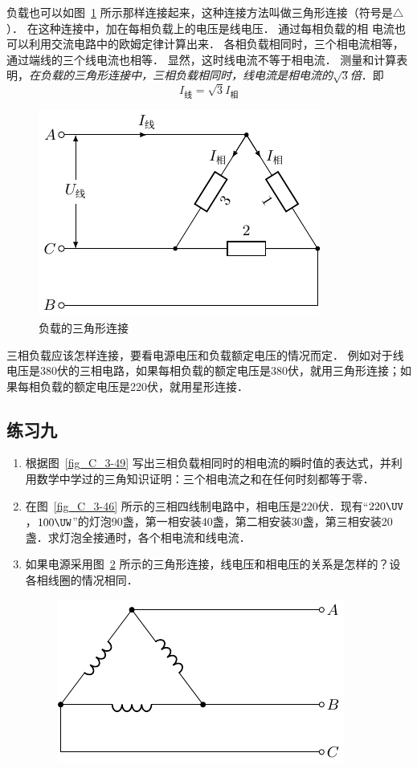 负载也可以如图~\ref{fig_C_3-52} 所示那样连接起来，这种连接方法叫做三角形连接（符号是$\triangle$）．
在这种连接中，加在每相负载上的电压是线电压．
通过每相负载的相
电流也可以利用交流电路中的欧姆定律计算出来．
各相负载相同时，三个相电流相等，通过端线的三个线电流也相等．
显然，这时线电流不等于相电流．
测量和计算表明，\textit{在负载的三角形连接中，三相负载相同时，线电流是相电流的$\sqrt{3}$倍}．即
\[I_{\text{线}}=\sqrt{3}I_{\text{相}}\]
\begin{figure}[htbp]
    \centering
    \includegraphics{fig/C/3-52.pdf}
    \caption{负载的三角形连接}\label{fig_C_3-52}
\end{figure}

三相负载应该怎样连接，要看电源电压和负载额定电压的情况而定．
例如对于线电压是380伏的三相电路，如果每相负载的额定电压是380伏，就用三角形连接；如果每相负载的额定电压是220伏，就用星形连接．

\subsection*{练习九}
\begin{enumerate}
    \item 根据图~\ref{fig_C_3-49} 写出三相负载相同时的相电流的瞬时值的表达式，并利用数学中学过的三角知识证明：三个相电流之和在任何时刻都等于零．
    \item 在图~\ref{fig_C_3-46} 所示的三相四线制电路中，相电压是220伏．现有“$220\UV $，$ 100\UW$”的灯泡90盏，第一相安装40盏，第二相安装30盏，第三相安装20盏．求灯泡全接通时，各个相电流和线电流．
    \item 如果电源采用图~\ref{fig_C_3-53} 所示的三角形连接，线电压和相电压的关系是怎样的？设各相线圈的情况相同．
    \begin{figure}[htbp]
    	\centering
    	\includegraphics{fig/C/3-53.pdf}
    	\caption{}\label{fig_C_3-53}
    \end{figure}
\end{enumerate}



